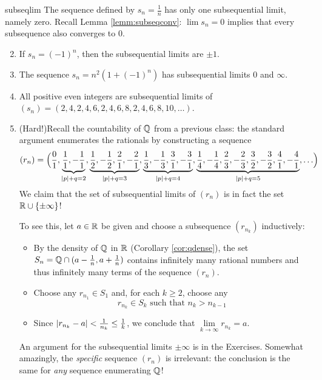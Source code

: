 \begin{examples}{}{subseqlim}
	\exstart The sequence defined by $s_n=\frac 1n$ has only one subsequential limit, namely zero. Recall Lemma \ref{lemm:subseqconv}: $\lim s_n=0$ implies that every subsequence also converges to 0.
	\begin{enumerate}\setcounter{enumi}{1}
	  \item If $s_n=(-1)^n$, then the subsequential limits are $\pm 1$. %
	  \item The sequence $s_n=n^2(1+(-1)^n)$ has subsequential limits 0 and $\infty$.
	  \item All positive even integers are subsequential limits of $(s_n)=(2,4,2,4,6,2,4,6,8,2,4,6,8,10,\ldots)$.
	
	
		\item\label{ex:subseqlim2} (Hard!)\lstsp Recall the countability of $\mathbb{Q}$ from a previous class: the standard argument enumerates the rationals by constructing a sequence
		\[(r_n)=\Bigl(\frac 01,\underbrace{\frac 11,-\frac 11}_{\left| p\right|+q=2}, \underbrace{\frac 12,-\frac 12,\frac 21,-\frac 21}_{\left| p\right|+q=3}, \underbrace{\frac 13,-\frac 13,\frac 31,-\frac 31}_{\left| p\right|+q=4}, \underbrace{\frac 14,-\frac 14,\frac 23,-\frac 23,\frac 32,-\frac 32,\frac 41,-\frac 41}_{\left| p\right|+q=5},\ldots\Bigr)\]
		We claim that the set of subsequential limits of $(r_n)$ is in fact the set $\mathbb{R}\cup\{\pm\infty\}$!\par
		To see this, let $a\in\mathbb{R}$ be given and choose a subsequence $(r_{n_k})$ inductively:
		\begin{itemize}
		  \item By the density of $\mathbb{Q}$ in $\mathbb{R}$ (Corollary \ref{cor:qdense}), the set $S_n=\mathbb{Q}\cap (a-\frac 1n,a+\frac 1n)$ contains infinitely many rational numbers and thus infinitely many terms of the sequence $(r_n)$.
		  \item Choose any $r_{n_1}\in S_1$ and, for each $k\ge 2$, choose any%
		  \[
		  	r_{n_k}\in S_k\text{ \ such that \ }n_k>n_{k-1}
		  \]
		  \item Since $\left| r_{n_k}-a\right|<\frac 1{n_k}\le \frac 1k$, we conclude that $\lim\limits_{k\to\infty}r_{n_k}=a$.
		\end{itemize}
		An argument for the subsequential limits $\pm\infty$ is in the Exercises. Somewhat amazingly, the \emph{specific} sequence $(r_n)$ is irrelevant: the conclusion is the same for \emph{any} sequence enumerating $\mathbb{Q}$!
		

\end{enumerate}
\end{examples}
